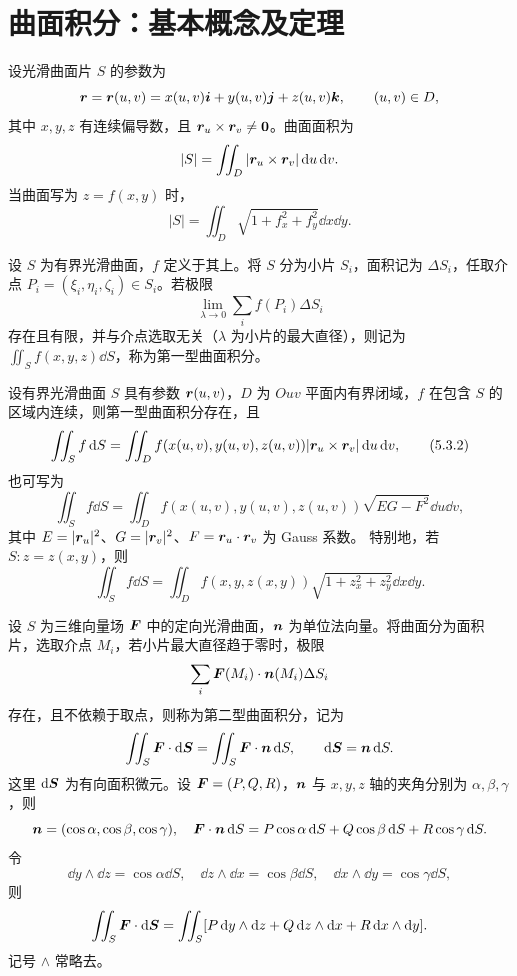 \clearpage
\section{曲面积分：基本概念及定理}
设光滑曲面片 $S$ 的参数为
\[
\bm{r}=\bm{r}(u,v)=x(u,v)\bm{i}+y(u,v)\bm{j}+z(u,v)\bm{k},
\qquad (u,v)\in D,
\]
其中 $x,y,z$ 有连续偏导数，且 $\bm{r}_u\times\bm{r}_v\ne\bm{0}$。曲面面积为
\[
|S|=\iint_D|\bm{r}_u\times\bm{r}_v|\mathop{}\!\mathrm d u\mathop{}\!\mathrm d v.
\]
当曲面写为 $z=f(x,y)$ 时，
\begin{equation}
|S|=\iint_D\sqrt{1+f_x^2+f_y^2}\dd x\dd y.\tag{5.3.1}
\end{equation}

设 $S$ 为有界光滑曲面，$f$ 定义于其上。将 $S$ 分为小片 $S_i$，面积记为 $\Delta S_i$，任取介点 $P_i=(\xi_i,\eta_i,\zeta_i)\in S_i$。若极限
\[
\lim_{\lambda\to0}\sum_i f(P_i)\Delta S_i
\]
存在且有限，并与介点选取无关（$\lambda$ 为小片的最大直径），则记为 $\iint_S f(x,y,z)\dd S$，称为第一型曲面积分。

设有界光滑曲面 $S$ 具有参数 $\bm{r}(u,v)$，$D$ 为 $Ouv$ 平面内有界闭域，$f$ 在包含 $S$ 的区域内连续，则第一型曲面积分存在，且
\begin{equation}
\iint_S f\mathop{}\!\mathrm d S=\iint_D f(x(u,v),y(u,v),z(u,v))|\bm{r}_u\times\bm{r}_v|\mathop{}\!\mathrm d u\mathop{}\!\mathrm d v,\tag{5.3.2}
\end{equation}
也可写为
\begin{equation}
\iint_S f\dd S=\iint_D f(x(u,v),y(u,v),z(u,v))\sqrt{EG-F^2}\dd u\dd v,\tag{5.3.3}
\end{equation}
其中 $E=|\bm{r}_u|^2$、$G=|\bm{r}_v|^2$、$F=\bm{r}_u\cdot\bm{r}_v$ 为 Gauss 系数。
特别地，若 $S:z=z(x,y)$，则
\[
\iint_S f\dd S=\iint_D f(x,y,z(x,y))\sqrt{1+z_x^2+z_y^2}\dd x\dd y.
\]

设 $S$ 为三维向量场 $\bm{F}$ 中的定向光滑曲面，$\bm{n}$ 为单位法向量。将曲面分为面积片，选取介点 $M_i$，若小片最大直径趋于零时，极限
\[
\sum_i\bm{F}(M_i)\cdot\bm{n}(M_i)\Delta S_i
\]
存在，且不依赖于取点，则称为第二型曲面积分，记为
\[
\iint_S\bm{F}\cdot\mathop{}\!\mathrm d\bm{S}=\iint_S\bm{F}\cdot\bm{n}\mathop{}\!\mathrm d S,
\qquad\mathop{}\!\mathrm d\bm{S}=\bm{n}\mathop{}\!\mathrm d S.
\]
这里 $\mathop{}\!\mathrm d\bm{S}$ 为有向面积微元。设 $\bm{F}=(P,Q,R)$，$\bm{n}$ 与 $x,y,z$ 轴的夹角分别为 $\alpha,\beta,\gamma$，则
\[
\bm{n}=(\cos\alpha,\cos\beta,\cos\gamma),\quad
\bm{F}\cdot\bm{n}\mathop{}\!\mathrm d S=P\cos\alpha\mathop{}\!\mathrm d S+Q\cos\beta\mathop{}\!\mathrm d S+R\cos\gamma\mathop{}\!\mathrm d S.
\]
令
\[
\dd y\wedge\dd z=\cos\alpha\dd S,\quad
\dd z\wedge\dd x=\cos\beta\dd S,\quad
\dd x\wedge\dd y=\cos\gamma\dd S,
\]
则
\[
\iint_S\bm{F}\cdot\mathop{}\!\mathrm d\bm{S}
=\iint_S[P\mathop{}\!\mathrm d y\wedge\mathop{}\!\mathrm d z+Q\mathop{}\!\mathrm d z\wedge\mathop{}\!\mathrm d x+R\mathop{}\!\mathrm d x\wedge\mathop{}\!\mathrm d y].
\]
记号 $\wedge$ 常略去。


